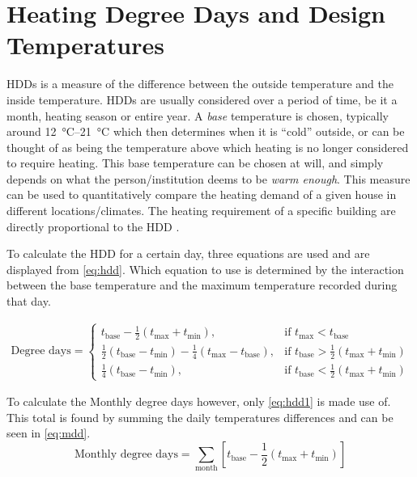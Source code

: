 \section{Heating Degree Days and Design Temperatures} \label{sec:hddanddesign}
\acp{HDD} is a measure of the difference between the outside temperature and the inside temperature. \acp{HDD} are usually considered over a period of time, be it a month, heating season or entire year. A \textit{base} temperature is chosen, typically around \qtyrange{12}{21}{\celsius} which then determines when it is ``cold'' outside, or can be thought of as being the temperature above which heating is no longer considered to require heating. This base temperature can be chosen at will, and simply depends on what the person/institution deems to be \textit{warm enough}. This measure can be used to quantitatively compare the heating demand of a given house in different locations/climates. The heating requirement of a specific building are directly proportional to the \ac{HDD} \cite{chartered_institution_of_building_services_engineers_environmental_2006}.

To calculate  the \ac{HDD} for a certain day, three equations are used and are displayed from \cref{eq:hdd}. Which equation to use is determined by the interaction between the base temperature and the maximum temperature recorded during that day.  

\begin{align}\label{eq:hdd}
    \text{Degree days} = \begin{cases}
        t_\text{base} - \frac12(t_\text{max} + t_\text{min}), & \text{if } t_\text{max} < t_\text{base}\\
        \frac12(t_\text{base} - t_\text{min}) -\frac14(t_\text{max} -t_\text{base} ), & \text{if } t_\text{base} > \frac12(t_\text{max} + t_\text{min}) \\
        \frac14(t_\text{base} -t_\text{min} ), & \text{if } t_\text{base} <\frac12(t_\text{max} + t_\text{min})
     \end{cases}  
\end{align}

To calculate the Monthly degree days however, only \cref{eq:hdd1} is made use of. This total is found by summing the daily temperatures differences and can be seen in \cref{eq:mdd}.
\begin{equation}
    \text{Monthly degree days} = \displaystyle\sum_\text{month} \left[t_\text{base} - \frac12(t_\text{max} + t_\text{min})\right] \label{eq:mdd}
\end{equation}

